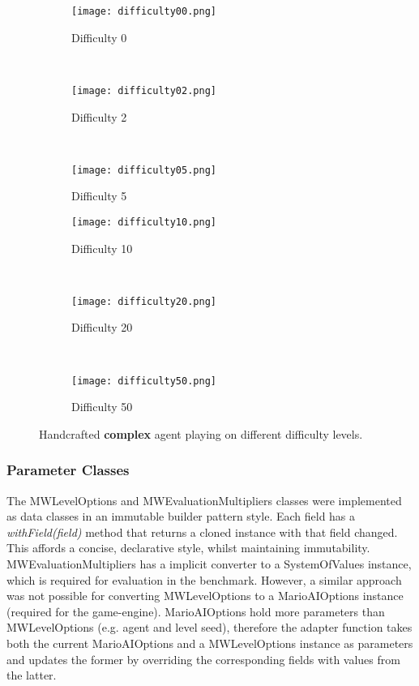 \begin{figure}[t]
	\begin{adjustwidth}{-2cm}{-2cm}
    \centering
          \begin{subfigure}[b]{0.32\textwidth}
                  \centering
                  \texttt{[image: difficulty00.png]}
                  \caption{Difficulty 0}
          \end{subfigure}~
          \begin{subfigure}[b]{0.32\textwidth}
                  \centering
                  \texttt{[image: difficulty02.png]}
                  \caption{Difficulty 2}
          \end{subfigure}~
          \begin{subfigure}[b]{0.32\textwidth}
                  \centering
                  \texttt{[image: difficulty05.png]}
                  \caption{Difficulty 5}
          \end{subfigure}
          \begin{subfigure}[b]{0.32\textwidth}
                  \centering
                  \texttt{[image: difficulty10.png]}
                  \caption{Difficulty 10}
          \end{subfigure}~
          \begin{subfigure}[b]{0.32\textwidth}
                  \centering
                  \texttt{[image: difficulty20.png]}
                  \caption{Difficulty 20}
          \end{subfigure}~
          \begin{subfigure}[b]{0.32\textwidth}
                  \centering
                  \texttt{[image: difficulty50.png]}
                  \caption{Difficulty 50}
          \end{subfigure}
    \caption{Handcrafted \textbf{complex} agent playing on different difficulty levels.}\label{fig:lpdiff}
    \end{adjustwidth}
\end{figure}

\subsubsection{Parameter Classes}
\label{subsec:paramclasses}

The MWLevelOptions and MWEvaluationMultipliers classes were implemented as data classes in an immutable builder pattern style. Each field has a \emph{withField(field)} method that returns a cloned instance with that field changed. This affords a concise, declarative style, whilst maintaining immutability. MWEvaluationMultipliers has a implicit converter to a SystemOfValues instance, which is required for evaluation in the benchmark. However, a similar approach was not possible for converting MWLevelOptions to a MarioAIOptions instance (required for the game-engine). MarioAIOptions hold more parameters than MWLevelOptions (e.g. agent and level seed), therefore the adapter function takes both the current MarioAIOptions and a MWLevelOptions instance as parameters and updates the former by overriding the corresponding fields with values from the latter.

